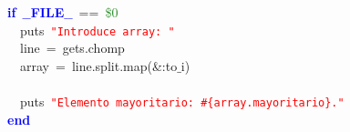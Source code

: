 \mbox{}\textbf{\textcolor{Blue}{if}}\ \textbf{\textcolor{Blue}{$\_$$\_$FILE$\_$$\_$}}\ \textcolor{BrickRed}{==}\ \textcolor{ForestGreen}{\$0} \\
\mbox{}\ \ puts\ \texttt{\textcolor{Red}{"{}Introduce\ array:\ "{}}} \\
\mbox{}\ \ line\ \textcolor{BrickRed}{=}\ gets\textcolor{BrickRed}{.}chomp \\
\mbox{}\ \ array\ \textcolor{BrickRed}{=}\ line\textcolor{BrickRed}{.}split\textcolor{BrickRed}{.}map\textcolor{BrickRed}{(\&:}to$\_$i\textcolor{BrickRed}{)} \\
\mbox{} \\
\mbox{}\ \ puts\ \texttt{\textcolor{Red}{"{}Elemento\ mayoritario:\ \#\{array.mayoritario\}."{}}} \\
\mbox{}\textbf{\textcolor{Blue}{end}}
